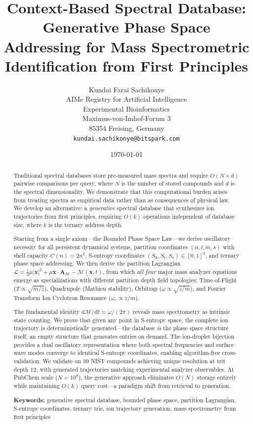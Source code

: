\documentclass[11pt,twocolumn,a4paper]{article}
\title{\textbf{Context-Based Spectral Database: Generative Phase Space Addressing for Mass Spectrometric Identification from First Principles}}
\author{
Kundai Farai Sachikonye\\
AIMe Registry for Artificial Intelligence\\
Experimental Bioinformatics\\
Maximus-von-Imhof-Forum 3\\
85354 Freising, Germany\\
\texttt{kundai.sachikonye@bitspark.com}
}
\date{\today}
\theoremstyle{definition}
\theoremstyle{remark}
\newcommand{\Sk}{S_{\mathrm{k}}}
\newcommand{\St}{S_{\mathrm{t}}}
\newcommand{\Se}{S_{\mathrm{e}}}
\newcommand{\Depth}{\mathcal{M}}
\newcommand{\partinert}{\mu}
\newcommand{\Apartition}{\mathbf{A}_{\mathcal{M}}}
\newcommand{\Lagr}{\mathcal{L}}
\begin{document}
\maketitle

\begin{abstract}
Traditional spectral databases store pre-measured mass spectra and require $O(N \times d)$ pairwise comparisons per query, where $N$ is the number of stored compounds and $d$ is the spectral dimensionality. We demonstrate that this computational burden arises from treating spectra as empirical data rather than as consequences of physical law. We develop an alternative: a \emph{generative} spectral database that synthesizes ion trajectories from first principles, requiring $O(k)$ operations independent of database size, where $k$ is the ternary address depth.

Starting from a single axiom---the Bounded Phase Space Law---we derive oscillatory necessity for all persistent dynamical systems, partition coordinates $(n,l,m,s)$ with shell capacity $C(n)=2n^2$, S-entropy coordinates $(\Sk, \St, \Se) \in [0,1]^3$, and ternary phase space addressing. We then derive the partition Lagrangian $\Lagr = \tfrac{1}{2}\partinert |\dot{\mathbf{x}}|^2 + \partinert \dot{\mathbf{x}} \cdot \Apartition - \Depth(\mathbf{x},t)$, from which \emph{all four} major mass analyzer equations emerge as specializations with different partition depth field topologies: Time-of-Flight ($T \propto \sqrt{m/z}$), Quadrupole (Mathieu stability), Orbitrap ($\omega \propto \sqrt{z/m}$), and Fourier Transform Ion Cyclotron Resonance ($\omega_c \propto z/m$).

The fundamental identity $\mathrm{d}\Depth/\mathrm{d}t = \omega/(2\pi)$ reveals mass spectrometry as intrinsic state counting. We prove that given any point in S-entropy space, the complete ion trajectory is deterministically generated---the database \emph{is} the phase space structure itself, an empty structure that generates entries on demand. The ion-droplet bijection provides a dual oscillatory representation where both spectral frequencies and surface wave modes converge to identical S-entropy coordinates, enabling algorithm-free cross-validation. We validate on 39 NIST compounds achieving unique resolution at trit depth 12, with generated trajectories matching experimental analyzer observables. At PubChem scale ($N=10^8$), the generative approach eliminates $O(N)$ storage entirely while maintaining $O(k)$ query cost---a paradigm shift from retrieval to generation.

\medskip
\noindent\textbf{Keywords:} generative spectral database, bounded phase space, partition Lagrangian, S-entropy coordinates, ternary trie, ion trajectory generation, mass spectrometry from first principles
\end{abstract}
\end{document}
